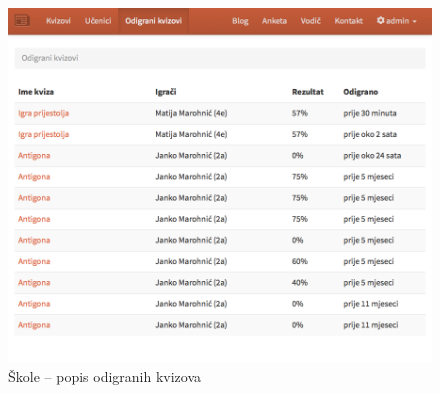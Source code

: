 \documentclass[11pt]{scrreprt}
\begin{document}
\begin{figure}[H]
  \includegraphics[width=\textwidth, clip=true, trim=0 10cm 0 0, fbox]{school/played_quizzes}
  \caption{Škole -- popis odigranih kvizova}
  \label{played_quizzes}
\end{figure}
\end{document}
